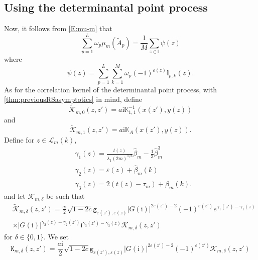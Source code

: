 \documentclass[11pt,twoside]{amsart}
\theoremstyle{plain}
\numberwithin{quest}{section}
\theoremstyle{remark}
\numberwithin{rem}{section}
\theoremstyle{definition}
\newcommand{\eps}{\varepsilon}
\begin{document}
\subsection{Using  the determinantal point process}
Now, it follows from \eqref{E:mu-m} that
\begin{equation}\label{E:heighttoparticles}
	\sum_{p=1}^L \omega_p \mu_m(\tilde{A}_p)=\frac{1}{M} \sum_{z \in \mathbb{I}} \psi(z)
\end{equation}
where
\begin{equation*}
	\psi(z)=\sum_{p=1}^{L} \sum_{k=1}^M \omega_p (-1)^{\eps(z)} \mathbb{I}_{p,k}(z).
\end{equation*}
As for the correlation kernel of the determinantal point process, with \cref{thm:previousRSasymptotics} in mind, define
\begin{equation*}
	\tilde{ \mathcal{K}}_{m,0}(z,z')=a\mathrm{i} \mathbb{K}_{1,1}^{-1}(x(z'),y(z))
\end{equation*}
and 
\begin{equation*}
	\tilde{ \mathcal{K}}_{m,1}(z,z')=a\mathrm{i} \mathbb{K}_A(x(z'),y(z)).
\end{equation*}
Define for $z \in \mathcal{L}_m(k)$,
\begin{equation*} 
	\begin{split}
		&\gamma_1(z)=\frac{t(z)}{\lambda_1(2m)^{1/3}} \hat{\beta}_m -\frac{1}{3} \hat{\beta}_m^3\\
		&\gamma_2(z)=\eps(z)+\hat{\beta}_m(k)\\
		&\gamma_3(z)=2(t(z)-\tau_m)+\hat{\beta}_m(k).
	\end{split}
\end{equation*}
and let $\mathcal{K}_{m,\delta}$ be such that 
\begin{equation}
	\begin{split}\label{Kmdelta}
		&\tilde{\mathcal{K}}_{m,\delta}(z,z')=\frac{a \mathrm{i}}{2} \sqrt{1-2c} \mathtt{g}_{\eps(z'),\eps(z)}|G(\mathrm{i})|^{2 \eps(z')-2}(-1)^{\eps(z')} e^{\gamma_1(z')-\gamma_1(z)} \\
		&\times |G(\mathrm{i})|^{\gamma_2(z)-\gamma_2(z')} \mathrm{i}^{\gamma_3(z')-\gamma_3(z)} {\mathcal{K}}_{m,\delta}(z,z')
	\end{split}
\end{equation}
for $\delta \in \{0,1\}$.  We set 
\begin{equation*}
	\mathtt{K}_{m, \delta}(z,z')=\frac{a \mathrm{i}}{2} \sqrt{1-2c} \mathtt{g}_{\eps(z'),\eps(z)}|G(\mathrm{i})|^{2 \eps(z')-2}(-1)^{\eps(z')}  \mathcal{K}_{m, \delta}(z,z')
\end{equation*}
\end{document}
